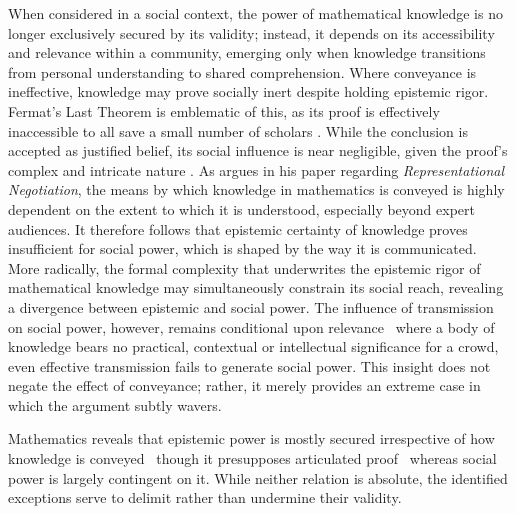 \documentclass[12pt]{article}
\begin{document}
When considered in a social context, the power of mathematical knowledge is no longer exclusively secured by its validity; instead, it depends on its accessibility and relevance within a community, emerging only when knowledge transitions from personal understanding to shared comprehension. Where conveyance is ineffective, knowledge may prove socially inert despite holding epistemic rigor. Fermat's Last Theorem is emblematic of this, as its proof is effectively inaccessible to all save a small number of scholars \parencite{Cambridge_FLT_History}. While the conclusion is accepted as justified belief, its social influence is near negligible, given the proof's complex and intricate nature \parencite{Boston_FLT_2003}. As \textcite{STYLIANOU2002303} argues in his paper regarding \textit{Representational Negotiation}, the means by which knowledge in mathematics is conveyed is highly dependent on the extent to which it is understood, especially beyond expert audiences. It therefore follows that epistemic certainty of knowledge proves insufficient for social power, which is shaped by the way it is communicated. More radically, the formal complexity that underwrites the epistemic rigor of mathematical knowledge may simultaneously constrain its social reach, revealing a divergence between epistemic and social power. The influence of transmission on social power, however, remains conditional upon relevance \textemdash\ where a body of knowledge bears no practical, contextual or intellectual significance for a crowd, even effective transmission fails to generate social power. This insight does not negate the effect of conveyance; rather, it merely provides an extreme case in which the argument subtly wavers.

Mathematics reveals that epistemic power is mostly secured irrespective of how knowledge is conveyed \textemdash\ though it presupposes articulated proof \textemdash\ whereas social power is largely contingent on it. While neither relation is absolute, the identified exceptions serve to delimit rather than undermine their validity.
\end{document}
